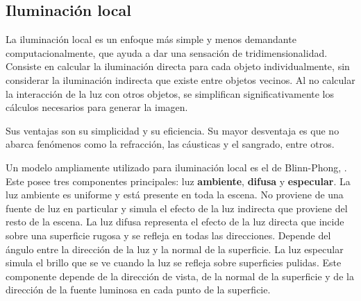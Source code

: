 \subsection{Iluminación local}

La iluminación local es un enfoque más simple y menos demandante computacionalmente, que ayuda a dar una sensación de tridimensionalidad.
Consiste en calcular la iluminación directa para cada objeto individualmente, sin considerar la iluminación indirecta que existe entre objetos vecinos.
Al no calcular la interacción de la luz con otros objetos, se simplifican significativamente los cálculos necesarios para generar la imagen.

Sus ventajas son su simplicidad y su eficiencia.
Su mayor desventaja es que no abarca fenómenos como la refracción, las cáusticas y el sangrado, entre otros.

Un modelo ampliamente utilizado para iluminación local es el de Blinn-Phong, \cite{blinn-phong}.
Este posee tres componentes principales: luz \textbf{ambiente}, \textbf{difusa} y \textbf{especular}.
La luz ambiente es uniforme y está presente en toda la escena.
No proviene de una fuente de luz en particular y simula el efecto de la luz indirecta que proviene del resto de la escena.
La luz difusa representa el efecto de la luz directa que incide sobre una superficie rugosa y se refleja en todas las direcciones.
Depende del ángulo entre la dirección de la luz y la normal de la superficie.
La luz especular simula el brillo que se ve cuando la luz se refleja sobre superficies pulidas.
Este componente depende de la dirección de vista, de la normal de la superficie y de la dirección de la fuente luminosa en cada punto de la superficie.



